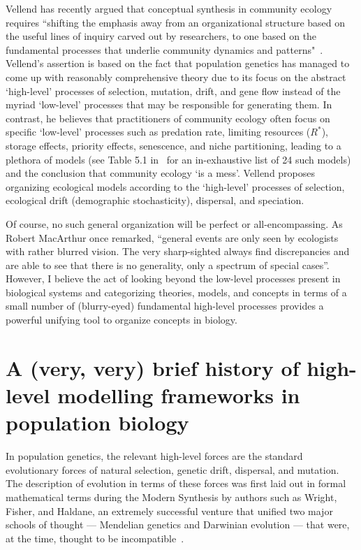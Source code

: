 Vellend has recently argued that conceptual synthesis in community ecology requires ``shifting the emphasis away from an organizational structure based on the useful lines of inquiry carved out by researchers, to one based on the fundamental processes that underlie community dynamics and patterns"~\citep{vellend_theory_2016}. Vellend's assertion is based on the fact that population genetics has managed to come up with reasonably comprehensive theory due to its focus on the abstract `high-level' processes of selection, mutation, drift, and gene flow instead of the myriad `low-level' processes that may be responsible for generating them. In contrast, he believes that practitioners of community ecology often focus on specific `low-level' processes such as predation rate, limiting resources ($R^*$), storage effects, priority effects, senescence, and niche partitioning, leading to a plethora of models (see Table 5.1 in~\citep{vellend_theory_2016} for an in-exhaustive list of 24 such models) and the conclusion that community ecology `is a mess'. Vellend proposes organizing ecological models according to the `high-level' processes of selection, ecological drift (demographic stochasticity), dispersal, and speciation.

Of course, no such general organization will be perfect or all-encompassing. As Robert MacArthur once remarked, ``general events are only seen by ecologists with rather blurred vision. The very sharp-sighted always find discrepancies and are able to see that there is no generality, only a spectrum of special cases”\citep{kingsland_modeling_1985}. However, I believe the act of looking beyond the low-level processes present in biological systems and categorizing theories, models, and concepts in terms of a small number of (blurry-eyed) fundamental high-level processes provides a powerful unifying tool to organize concepts in biology.

\section{A (very, very) brief history of high-level modelling frameworks in population biology}

In population genetics, the relevant high-level forces are the standard evolutionary forces of natural selection, genetic drift, dispersal, and mutation. The description of evolution in terms of these forces was first laid out in formal mathematical terms during the Modern Synthesis by authors such as Wright, Fisher, and Haldane, an extremely successful venture that unified two major schools of thought --- Mendelian genetics and Darwinian evolution --- that were, at the time, thought to be incompatible~\citep{provine_origins_2001}.

